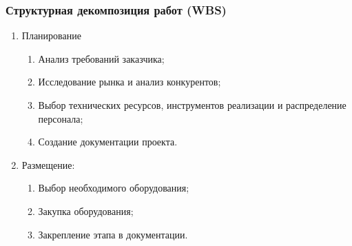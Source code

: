 \documentclass[14pt, russian]{matmex-diploma-custom}
\begin{document}
\subsubsection{Структурная декомпозиция работ (WBS)}
\begin{enumerate}
    \item Планирование
    \begin{enumerate}
        \item Анализ требований заказчика;
        \item Исследование рынка и анализ конкурентов;
        \item Выбор технических ресурсов, инструментов реализации и распределение персонала;
        \item Создание документации проекта.
    \end{enumerate}

    \item Размещение:
    \begin{enumerate}
        \item Выбор необходимого оборудования;
        \item Закупка оборудования;
        \item Закрепление этапа в документации.
    \end{enumerate}


\end{enumerate}
\end{document}
